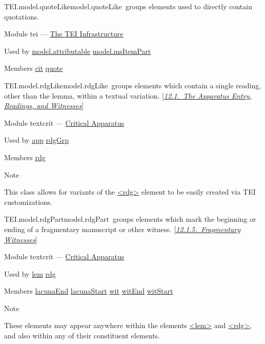 \begin{reflist}
\item[]\begin{specHead}{TEI.model.quoteLike}{model.quoteLike} groups elements used to directly contain quotations.\end{specHead} 
    \item[{Module}]
  tei — \hyperref[ST]{The TEI Infrastructure}
    \item[{Used by}]
  \hyperref[TEI.model.attributable]{model.attributable} \hyperref[TEI.model.msItemPart]{model.msItemPart}
    \item[{Members}]
  \hyperref[TEI.cit]{cit} \hyperref[TEI.quote]{quote}
\end{reflist}  
\begin{reflist}
\item[]\begin{specHead}{TEI.model.rdgLike}{model.rdgLike} groups elements which contain a single reading, other than the lemma, within a textual variation. [\textit{\hyperref[TCAPLL]{12.1.\ The Apparatus Entry, Readings, and Witnesses}}]\end{specHead} 
    \item[{Module}]
  textcrit — \hyperref[TC]{Critical Apparatus}
    \item[{Used by}]
  \hyperref[TEI.app]{app} \hyperref[TEI.rdgGrp]{rdgGrp}
    \item[{Members}]
  \hyperref[TEI.rdg]{rdg}
    \item[{Note}]
  \par
This class allows for variants of the \hyperref[TEI.rdg]{<rdg>} element to be easily created via TEI customizations.
\end{reflist}  
\begin{reflist}
\item[]\begin{specHead}{TEI.model.rdgPart}{model.rdgPart} groups elements which mark the beginning or ending of a fragmentary manuscript or other witness. [\textit{\hyperref[TCAPMI]{12.1.5.\ Fragmentary Witnesses}}]\end{specHead} 
    \item[{Module}]
  textcrit — \hyperref[TC]{Critical Apparatus}
    \item[{Used by}]
  \hyperref[TEI.lem]{lem} \hyperref[TEI.rdg]{rdg}
    \item[{Members}]
  \hyperref[TEI.lacunaEnd]{lacunaEnd} \hyperref[TEI.lacunaStart]{lacunaStart} \hyperref[TEI.wit]{wit} \hyperref[TEI.witEnd]{witEnd} \hyperref[TEI.witStart]{witStart}
    \item[{Note}]
  \par
These elements may appear anywhere within the elements \hyperref[TEI.lem]{<lem>} and \hyperref[TEI.rdg]{<rdg>}, and also within any of their constituent elements.
\end{reflist}  
